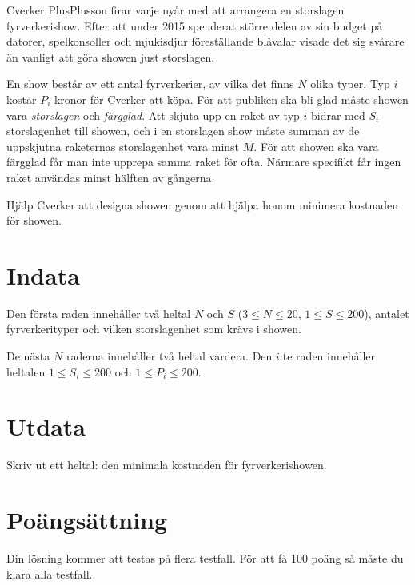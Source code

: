 Cverker PlusPlusson firar varje nyår med att arrangera en storslagen fyrverkerishow. Efter att under 2015 spenderat större delen av sin budget på datorer, spelkonsoller och mjukisdjur föreställande blåvalar visade det sig svårare än vanligt att göra showen just storslagen.

En show består av ett antal fyrverkerier, av vilka det finns $N$ olika typer. Typ $i$ kostar $P_i$ kronor för Cverker att köpa. För att publiken ska bli glad måste showen vara \emph{storslagen} och \emph{färgglad}. Att skjuta upp en raket av typ $i$ bidrar med $S_i$ storslagenhet till showen, och i en storslagen show måste summan av de uppskjutna raketernas storslagenhet vara minst $M$. För att showen ska vara färgglad får man inte upprepa samma raket för ofta. Närmare specifikt får ingen raket användas minst hälften av gångerna.

Hjälp Cverker att designa showen genom att hjälpa honom minimera kostnaden för showen.

\section*{Indata}
Den första raden innehåller två heltal $N$ och $S$ ($3 \le N \le 20$, $1 \le S \le 200$), antalet
fyrverkerityper och vilken storslagenhet som krävs i showen.

De nästa $N$ raderna innehåller två heltal vardera. Den $i$:te raden innehåller heltalen $1 \le S_i \le 200$ och $1 \le P_i \le 200$.

\section*{Utdata}
Skriv ut ett heltal: den minimala kostnaden för fyrverkerishowen.

\section*{Poängsättning}
Din lösning kommer att testas på flera testfall. För att få 100 poäng så måste du klara alla testfall.

